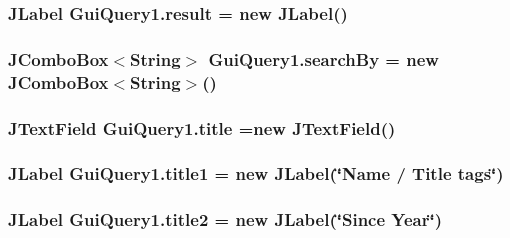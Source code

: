 \subsubsection[{\texorpdfstring{result}{result}}]{\setlength{\rightskip}{0pt plus 5cm}J\+Label Gui\+Query1.\+result = new J\+Label()\hspace{0.3cm}{\ttfamily [protected]}}\hypertarget{classGuiQuery1_a80ba7c84c9af8294566e3c1f1787c4a3}{}\label{classGuiQuery1_a80ba7c84c9af8294566e3c1f1787c4a3}
\subsubsection[{\texorpdfstring{search\+By}{searchBy}}]{\setlength{\rightskip}{0pt plus 5cm}J\+Combo\+Box$<$String$>$ Gui\+Query1.\+search\+By = new J\+Combo\+Box$<$String$>$()\hspace{0.3cm}{\ttfamily [protected]}}\hypertarget{classGuiQuery1_a021ae2f4fa2ec342496af6ac434995f4}{}\label{classGuiQuery1_a021ae2f4fa2ec342496af6ac434995f4}
\subsubsection[{\texorpdfstring{title}{title}}]{\setlength{\rightskip}{0pt plus 5cm}J\+Text\+Field Gui\+Query1.\+title =new J\+Text\+Field()\hspace{0.3cm}{\ttfamily [protected]}}\hypertarget{classGuiQuery1_aeebb26c926dc7045d9bd99dd3568eb45}{}\label{classGuiQuery1_aeebb26c926dc7045d9bd99dd3568eb45}
\subsubsection[{\texorpdfstring{title1}{title1}}]{\setlength{\rightskip}{0pt plus 5cm}J\+Label Gui\+Query1.\+title1 = new J\+Label(\char`\"{}Name / Title tags\char`\"{})\hspace{0.3cm}{\ttfamily [protected]}}\hypertarget{classGuiQuery1_a31e28191d4f156f0367a7dac29b65836}{}\label{classGuiQuery1_a31e28191d4f156f0367a7dac29b65836}
\subsubsection[{\texorpdfstring{title2}{title2}}]{\setlength{\rightskip}{0pt plus 5cm}J\+Label Gui\+Query1.\+title2 = new J\+Label(\char`\"{}Since Year\char`\"{})\hspace{0.3cm}{\ttfamily [protected]}}\hypertarget{classGuiQuery1_ad120c79c1fe5e4b3ce09960942924c0d}{}\label{classGuiQuery1_ad120c79c1fe5e4b3ce09960942924c0d}
